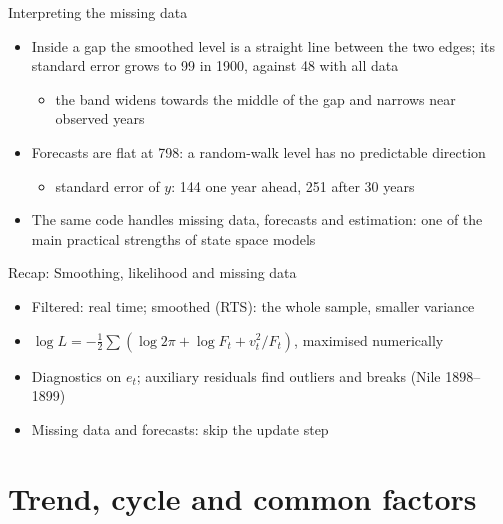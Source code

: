 \begin{frame}{Interpreting the missing data}
\itemsize{\small}
\begin{itemize}
    \item Inside a gap the smoothed level is a straight line between the two edges; its standard error grows to 99 in 1900, against 48 with all data
    \begin{itemize}
        \item the band widens towards the middle of the gap and narrows near observed years
    \end{itemize}
    \item Forecasts are flat at 798: a random-walk level has no predictable direction
    \begin{itemize}
        \item standard error of $y$: 144 one year ahead, 251 after 30 years
    \end{itemize}
    \item The same code handles missing data, forecasts and estimation: one of the main practical strengths of state space models
\end{itemize}
\end{frame}

\begin{frame}{Recap: Smoothing, likelihood and missing data}
\itemsize{\small}
\begin{itemize}
    \item Filtered: real time; smoothed (RTS): the whole sample, smaller variance
    \item $\log L = -\frac12\sum(\log 2\pi + \log F_t + v_t^2/F_t)$, maximised numerically
    \item Diagnostics on $e_t$; auxiliary residuals find outliers and breaks (Nile 1898--1899)
    \item Missing data and forecasts: skip the update step
\end{itemize}
\end{frame}


\section{Trend, cycle and common factors}

